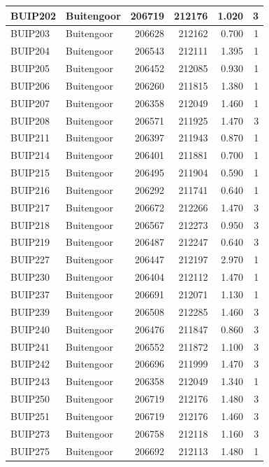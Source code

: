 \documentclass[11pt,]{book}
\begin{document}
\begin{table}
\begin{tabular}[t]{l|l|r|r|r|r}
\hline
BUIP202 & Buitengoor & 206719 & 212176 & 1.020 & 3\\
\hline
BUIP203 & Buitengoor & 206628 & 212162 & 0.700 & 1\\
\hline
BUIP204 & Buitengoor & 206543 & 212111 & 1.395 & 1\\
\hline
BUIP205 & Buitengoor & 206452 & 212085 & 0.930 & 1\\
\hline
BUIP206 & Buitengoor & 206260 & 211815 & 1.380 & 1\\
\hline
BUIP207 & Buitengoor & 206358 & 212049 & 1.460 & 1\\
\hline
BUIP208 & Buitengoor & 206571 & 211925 & 1.470 & 3\\
\hline
BUIP211 & Buitengoor & 206397 & 211943 & 0.870 & 1\\
\hline
BUIP214 & Buitengoor & 206401 & 211881 & 0.700 & 1\\
\hline
BUIP215 & Buitengoor & 206495 & 211904 & 0.590 & 1\\
\hline
BUIP216 & Buitengoor & 206292 & 211741 & 0.640 & 1\\
\hline
BUIP217 & Buitengoor & 206672 & 212266 & 1.470 & 3\\
\hline
BUIP218 & Buitengoor & 206567 & 212273 & 0.950 & 3\\
\hline
BUIP219 & Buitengoor & 206487 & 212247 & 0.640 & 3\\
\hline
BUIP227 & Buitengoor & 206447 & 212197 & 2.970 & 1\\
\hline
BUIP230 & Buitengoor & 206404 & 212112 & 1.470 & 1\\
\hline
BUIP237 & Buitengoor & 206691 & 212071 & 1.130 & 1\\
\hline
BUIP239 & Buitengoor & 206508 & 212285 & 1.460 & 3\\
\hline
BUIP240 & Buitengoor & 206476 & 211847 & 0.860 & 3\\
\hline
BUIP241 & Buitengoor & 206552 & 211872 & 1.100 & 3\\
\hline
BUIP242 & Buitengoor & 206696 & 211999 & 1.470 & 3\\
\hline
BUIP243 & Buitengoor & 206358 & 212049 & 1.340 & 1\\
\hline
BUIP250 & Buitengoor & 206719 & 212176 & 1.480 & 3\\
\hline
BUIP251 & Buitengoor & 206719 & 212176 & 1.460 & 3\\
\hline
BUIP273 & Buitengoor & 206758 & 212118 & 1.160 & 3\\
\hline
BUIP275 & Buitengoor & 206692 & 212113 & 1.480 & 1\\

\end{tabular}
\end{table}
\end{document}
